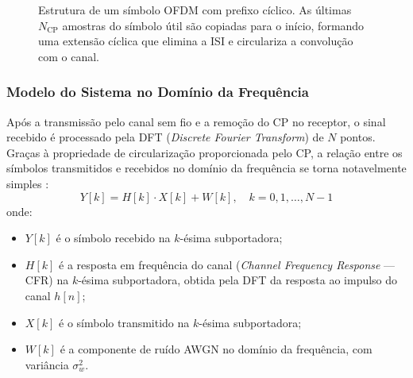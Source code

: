 \documentclass[conference]{IEEEtran}
\begin{document}
\begin{figure}[htbp]
    \centering
    \caption{Estrutura de um símbolo OFDM com prefixo cíclico. As últimas $N_{\text{CP}}$ amostras do símbolo útil são copiadas para o início, formando uma extensão cíclica que elimina a ISI e circulariza a convolução com o canal.}
    \label{fig:cp_ofdm}
\end{figure}

\subsubsection{Modelo do Sistema no Domínio da Frequência}

Após a transmissão pelo canal sem fio e a remoção do CP no receptor, o sinal recebido é processado pela DFT (\textit{Discrete Fourier Transform}) de $N$ pontos. Graças à propriedade de circularização proporcionada pelo CP, a relação entre os símbolos transmitidos e recebidos no domínio da frequência se torna notavelmente simples \cite{proakis2008}:
\begin{equation}
    Y[k] = H[k] \cdot X[k] + W[k], \quad k = 0, 1, \ldots, N-1
    \label{eq:ofdm_freq}
\end{equation}
onde:
\begin{itemize}
    \item $Y[k]$ é o símbolo recebido na $k$-ésima subportadora;
    \item $H[k]$ é a resposta em frequência do canal (\textit{Channel Frequency Response} --- CFR) na $k$-ésima subportadora, obtida pela DFT da resposta ao impulso do canal $h[n]$;
    \item $X[k]$ é o símbolo transmitido na $k$-ésima subportadora;
    \item $W[k]$ é a componente de ruído AWGN no domínio da frequência, com variância $\sigma_w^2$.
\end{itemize}
\end{document}

